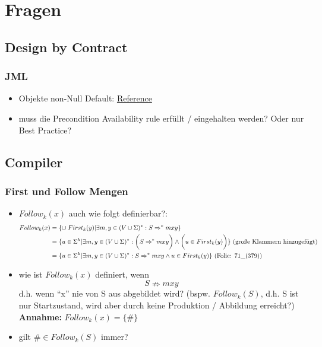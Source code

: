 \chapter{Fragen}
\section{Design by Contract}
\subsection{JML}
\begin{itemize}
	\item Objekte non-Null Default: \href{http://www.eecs.ucf.edu/~leavens/JML/jmlrefman/jmlrefman_2.html#SEC16}{Reference}
	\item muss die Precondition Availability rule  erfüllt / eingehalten werden? Oder nur Best Practice?
\end{itemize}

\section{Compiler}
\subsection{First und Follow Mengen}
\begin{itemize}
	\item $Follow_k(x)$ auch wie folgt definierbar?:
		\begin{align*}
			Follow_k(x) &= \{ \cup\; First_k(y) | \exists m,y \in (V \cup \Sigma)^* : S \Rightarrow^* mxy \}\\
						&= \{ u \in \Sigma^k | \exists m,y \in (V \cup \Sigma)^*: \bigg(S \Rightarrow^* mxy\bigg) \wedge \bigg( u \in First_k(y) \bigg) \} \text{ (große Klammern hinzugefügt)}\\
						&= \{ u \in \Sigma^k | \exists m,y \in (V \cup \Sigma)^*: S \Rightarrow^* mxy \wedge u \in First_k(y) \} \text{ (Folie: $71\_\text{(379)}$)}
		\end{align*}
	\item wie ist $Follow_k(x)$ definiert, wenn 
		$$S \nRightarrow mxy$$
		d.h. wenn \enquote{x} nie von S aus abgebildet wird? (bspw. $Follow_k(S)$, d.h. S ist nur Startzustand, wird aber durch keine Produktion / Abbildung erreicht?)\\
		\textbf{Annahme:} $Follow_k(x) = \{ \# \}$
	\item gilt $\# \in Follow_k(S)$ immer?
\end{itemize}